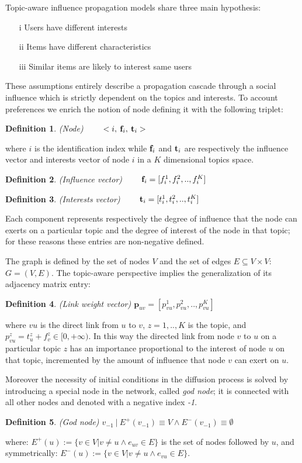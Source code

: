 Topic-aware influence propagation models share three main hypothesis: 
\begin{itemize}
\item[i] Users have different interests
\item[ii] Items have different characteristics
\item[iii] Similar items are likely to interest same users
\end{itemize}
These assumptions entirely describe a propagation cascade through a social influence which is  strictly dependent on the topics and interests. To account preferences we enrich the notion of node defining it with the following triplet:
\newtheorem{defn}{Definition}
\begin{defn}
	(Node)  $\qquad <i,\: \bold{f}_{i},\: \bold{t}_{i}>$
\end{defn}
 where $i$ is the identification index while $\bold{f}_{i}$ and $\bold{t}_{i}$ are respectively the influence vector and interests vector of node $i$ in a $K$ dimensional topics space.

\begin{defn} 
(Influence vector) $ \qquad \bold{f}_i=[f_i^{1}, f_i^{2}, .. , f_i^{K}]$
\end{defn}

\begin{defn}
(Interests vector) $ \qquad \bold{t}_i=[t_i^{1}, t_i^{2}, .. , t_i^{K}]  $
\end{defn}
Each component represents respectively the degree of influence that the node can exerts on a particular topic and the degree of interest of the node in that topic; for these reasons these entries are non-negative defined.

The graph is defined by the set of nodes $V$ and the set of edges $E \subseteq V\times V$: $G=(V,E)$. The topic-aware perspective implies the generalization of its adjacency matrix entry:
\begin{defn}
(Link weight vector) $\textbf{p}_{uv} = [p_{vu}^{1}, p_{vu}^{2}, .., p_{vu}^K]$  
\end{defn}
where $vu$ is the direct link from $u$ to $v$, $z=1,..,K$ is the topic, and
 $p_{vu}^{z} = t_u^z + f_v^z \in [0,+\infty)$. In this way the directed link from node $v$ to $u$ on a particular topic $z$ has an importance proportional to the interest of node $u$ on that topic, incremented by the amount of influence that node $v$ can exert on $u$.

Moreover the necessity of initial conditions in the diffusion process is solved by introducing a special node in the network, called \textit{god node}; it is connected with all other nodes and denoted with a negative index \textit{-1}.
\begin{defn}
(God node) $v_{-1}\:|\:E^+(v_{-1})\equiv V \wedge E^-(v_{-1})\equiv\emptyset$
\end{defn}
where: $E^+(u):= \{v \in V | v \neq u \wedge e_{uv} \in E \}$ is the set of nodes followed by $u$, and symmetrically: $E^-(u):= \{v \in V | v \neq u \wedge e_{vu} \in E \}$.


